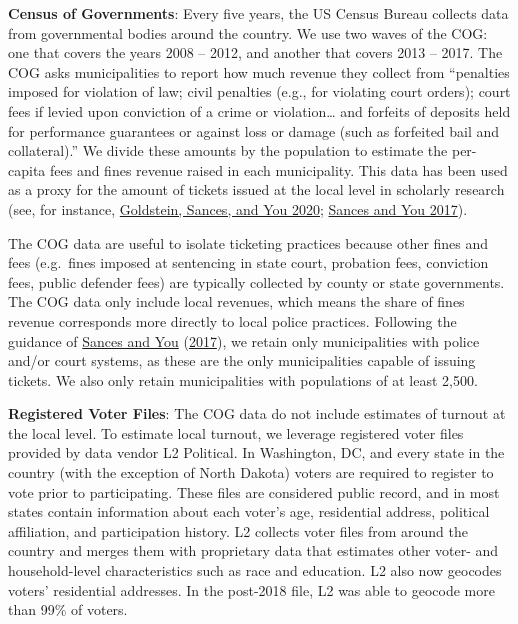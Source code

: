 \documentclass[
  12pt,
]{article}
\begin{document}
\textbf{Census of Governments}: Every five years, the US Census Bureau collects data from governmental bodies around the country. We use two waves of the COG: one that covers the years 2008 -- 2012, and another that covers 2013 -- 2017. The COG asks municipalities to report how much revenue they collect from ``penalties imposed for violation of law; civil penalties (e.g., for violating court orders); court fees if levied upon conviction of a crime or violation\ldots{} and forfeits of deposits held for performance guarantees or against loss or damage (such as forfeited bail and collateral).'' We divide these amounts by the population to estimate the per-capita fees and fines revenue raised in each municipality. This data has been used as a proxy for the amount of tickets issued at the local level in scholarly research (see, for instance, \protect\hyperlink{ref-Goldstein2020}{Goldstein, Sances, and You 2020}; \protect\hyperlink{ref-Sances2017}{Sances and You 2017}).

The COG data are useful to isolate ticketing practices because other fines and fees (e.g.~fines imposed at sentencing in state court, probation fees, conviction fees, public defender fees) are typically collected by county or state governments. The COG data only include local revenues, which means the share of fines revenue corresponds more directly to local police practices. Following the guidance of \protect\hyperlink{ref-Sances2017}{Sances and You} (\protect\hyperlink{ref-Sances2017}{2017}), we retain only municipalities with police and/or court systems, as these are the only municipalities capable of issuing tickets. We also only retain municipalities with populations of at least 2,500.

\textbf{Registered Voter Files}: The COG data do not include estimates of turnout at the local level. To estimate local turnout, we leverage registered voter files provided by data vendor L2 Political. In Washington, DC, and every state in the country (with the exception of North Dakota) voters are required to register to vote prior to participating. These files are considered public record, and in most states contain information about each voter's age, residential address, political affiliation, and participation history. L2 collects voter files from around the country and merges them with proprietary data that estimates other voter- and household-level characteristics such as race and education. L2 also now geocodes voters' residential addresses. In the post-2018 file, L2 was able to geocode more than 99\% of voters.
\end{document}
